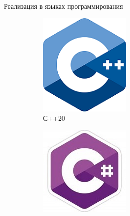\begin{frame}{Реализация в языках программирования}
	\begin{figure}
	\centering
	\hfill
	\begin{subfigure}[b]{0.22\linewidth}
		\includegraphics[width=\linewidth]{images/cpp.png}
		\caption{С++20}
	\end{subfigure}
	\hfill
	\begin{subfigure}[b]{0.25\linewidth}
		\includegraphics[width=\linewidth]{images/csharp.jpg} 

\end{subfigure}
\end{figure}
\end{frame}
